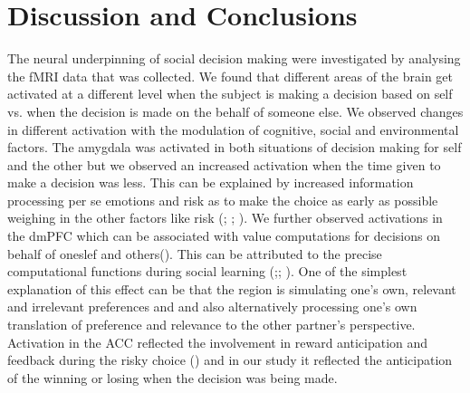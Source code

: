 \documentclass[11pt]{article}
\begin{document}
\section{Discussion and Conclusions}
The neural underpinning of social decision making were investigated by analysing the fMRI data that was collected. We found that different areas of the brain get activated at a different level when the subject is making a decision based on self vs. when the decision is made on the behalf of someone else. We observed changes in different activation with the modulation of cognitive, social and environmental factors. The amygdala was activated in both situations of decision making for self and the other but we observed an increased activation when the time given to make a decision was less. This can be explained by increased information processing per se emotions and risk as to make the choice as early as possible weighing in the other factors like risk (\citet{ghods2009fundamental}; \citet{smith2009neural}; \citet{morrison2010re}). We further observed activations in the dmPFC which can be associated with value computations for decisions on behalf of oneslef and others(\citet{cohen2005functional}). This can be attributed to the precise computational functions during social learning (\citet{behrens2008associative};\citet{behrens2009computation}; \citet{hampton2008neural}). One of the simplest explanation of this effect can be that the region is simulating one's own, relevant and irrelevant preferences and and also alternatively processing one's own translation of preference and relevance to the other partner's perspective. Activation in the ACC reflected the involvement in reward anticipation and feedback during the risky choice (\citet{ernst2004choice}) and in our study it reflected the anticipation of the winning or losing when the decision was being made. 

\medskip

 
\end{document}
